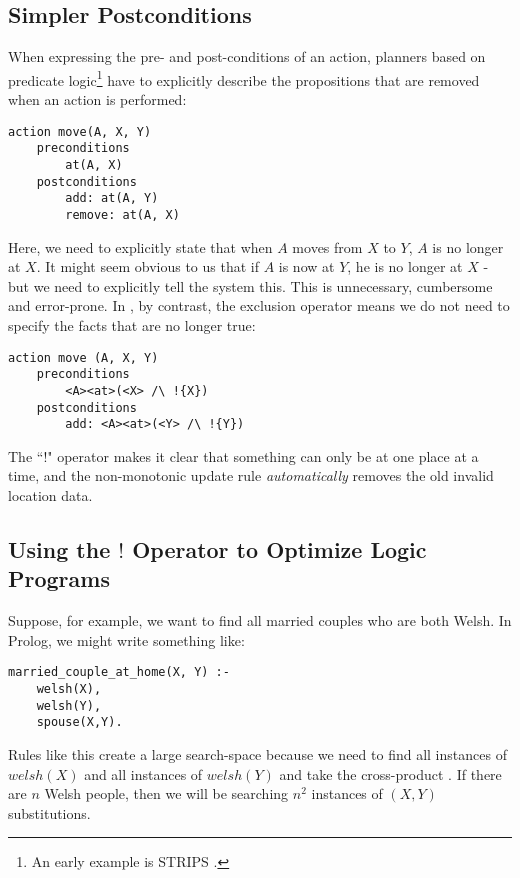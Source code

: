 \subsection{Simpler Postconditions}
When expressing the pre- and post-conditions of an action, planners based on predicate logic\footnote{An early example is STRIPS \cite{strips}.} have to explicitly describe the propositions that are removed when an action is performed:
\begin{verbatim}
action move(A, X, Y)
    preconditions
        at(A, X)
    postconditions
        add: at(A, Y) 
        remove: at(A, X)
\end{verbatim}
Here, we need to explicitly state that when $A$ moves from $X$ to $Y$, $A$ is no longer at $X$. It might seem obvious to us that if $A$ is now at $Y$, he is no longer at $X$ - but we need to explicitly tell the system this. This is unnecessary, cumbersome and error-prone. In \ELFULL{}, by contrast, the exclusion operator means we do not need to specify the facts that are no longer true:
\begin{verbatim}
action move (A, X, Y)
    preconditions
        <A><at>(<X> /\ !{X})
    postconditions
        add: <A><at>(<Y> /\ !{Y})
\end{verbatim}
The ``!" operator makes it clear that something can only be at one place at a time, and the non-monotonic update rule \emph{automatically} removes the old invalid location data.

\subsection{Using the $!$ Operator to Optimize Logic Programs}
Suppose, for example, we want to find all married couples who are both Welsh.
In Prolog, we might write something like:
\begin{verbatim}
married_couple_at_home(X, Y) :-
    welsh(X),
    welsh(Y),
    spouse(X,Y).
\end{verbatim}	
Rules like this create a large search-space because we need to find all instances of $welsh(X)$ and all instances of  $welsh(Y)$ and take the cross-product \cite{smith-and-genesereth}. If there are $n$ Welsh people, then we will be searching $n^2$ instances of $(X,Y)$ substitutions.

